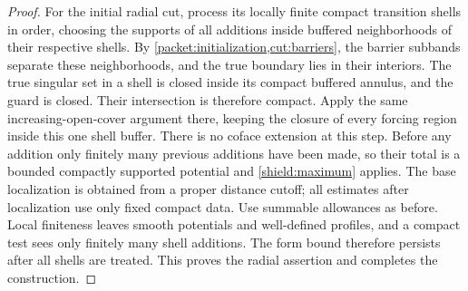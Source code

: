 \begin{proof}
For the initial radial cut, process its locally finite compact
transition shells in order, choosing the supports of all additions
inside buffered neighborhoods of their respective shells.
By \cref{packet:initialization,cut:barriers}, the barrier subbands
separate these neighborhoods, and the true boundary lies in
their interiors.  The true singular set in a shell is closed inside its compact buffered
annulus, and the guard is closed.  Their intersection is therefore
compact.  Apply the same increasing-open-cover argument there, keeping
the closure of every forcing region inside this one shell buffer.
There is no coface extension at this step.  Before any addition only
finitely many previous additions have
been made, so their total is a bounded compactly supported potential
and \cref{shield:maximum} applies.  The base localization is obtained
from a proper distance cutoff; all estimates after localization use
only fixed compact data.  Use summable allowances as before.  Local
finiteness leaves smooth potentials and well-defined profiles, and a
compact test sees only finitely many shell additions.  The form bound
therefore persists after all shells are treated.  This proves the
radial assertion and completes the construction.
\end{proof}
